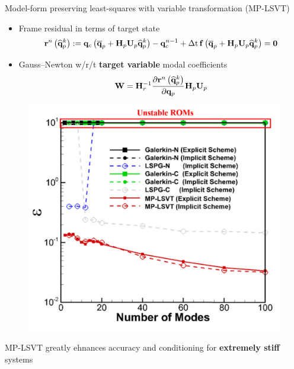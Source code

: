 \documentclass[]{beamer}
\begin{document}
\begin{frame}{\small{Model-form preserving least-squares with variable transformation (MP-LSVT)}}
	\begin{itemize}
		\item Frame residual in terms of target state\footnotemark[6]
		\begin{equation*}
			\resFuncIter{\timeIdx}{\primVecCoef^{\newtonIdx}} \defEq \consFunc{\primVecCent + \primScale \primTrial \primVecCoef^{\newtonIdx}} - \consVec^{\timeIdx-1} + \dt \, \rhsFunc{\primVecCent + \primScale \primTrial \primVecCoef^{\newtonIdx}} = \zeroVec
		\end{equation*}
		\item Gauss--Newton w/r/t \textbf{target variable} modal coefficients
		\begin{equation*}
			\testBasis = \resScaleInv \pde{\resFuncIter{\timeIdx}{\primVecCoef^{\newtonIdx}}}{\primVec} \primScale \primTrial
		\end{equation*}
	\end{itemize}
	\begin{minipage}{0.4\linewidth}
		\centering
		\begin{figure}
			\includegraphics[width=0.9\linewidth]{theory/mplsvt_err_vs_modes.png}
		\end{figure}
	\end{minipage}
	\begin{minipage}{0.58\linewidth}
		\begin{tcolorbox}[colframe=blue!50!white,halign=center]
			MP-LSVT greatly ehnances accuracy and conditioning for \textbf{extremely stiff} systems
		\end{tcolorbox}
	\end{minipage}
\end{frame}
\end{document}

